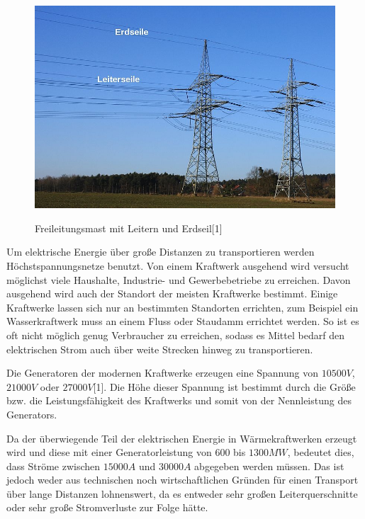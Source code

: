 \begin{figure}[t]
	\centering
	{\includegraphics[scale=0.5]{bilder/erdseil}\label{fig_erdseil}
	}\\
	\caption[Freileitungsmast mit Leitern und Erdseil]{Freileitungsmast mit Leitern und Erdseil[1]}
	\label{fig_erdseil}
\end{figure}
Um elektrische Energie über große Distanzen zu transportieren werden Höchstspannungsnetze benutzt. Von einem Kraftwerk ausgehend wird versucht möglichst viele Haushalte, Industrie- und Gewerbebetriebe zu erreichen. Davon ausgehend wird auch der Standort der meisten Kraftwerke bestimmt. Einige Kraftwerke lassen sich nur an bestimmten Standorten errichten, zum Beispiel ein Wasserkraftwerk muss an einem Fluss oder Staudamm errichtet werden. So ist es oft nicht möglich genug Verbraucher zu erreichen, sodass es Mittel bedarf den elektrischen Strom auch über weite Strecken hinweg zu transportieren.

Die Generatoren der modernen Kraftwerke erzeugen eine Spannung von $10500 V$, $21000V$ oder $27000V$[1]. Die Höhe dieser Spannung ist bestimmt durch die Größe bzw. die Leistungsfähigkeit des Kraftwerks und somit von der Nennleistung des Generators.

Da der überwiegende Teil der elektrischen Energie in Wärmekraftwerken erzeugt wird und diese mit einer Generatorleistung von $600$ bis $1300MW$, bedeutet dies, dass Ströme zwischen $15000A$ und $30000A$ abgegeben werden müssen. Das ist jedoch weder aus technischen noch wirtschaftlichen Gründen für einen Transport über lange Distanzen lohnenswert, da es entweder sehr großen Leiterquerschnitte oder sehr große Stromverluste zur Folge hätte.

